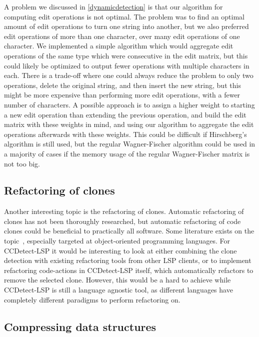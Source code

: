 A problem we discussed in \cref{dynamicdetection} is that our algorithm for computing edit
operations is not optimal. The problem was to find an optimal amount of edit operations to
turn one string into another, but we also preferred edit operations of more than one
character, over many edit operations of one character. We implemented a simple algorithm
which would aggregate edit operations of the same type which were consecutive in the edit
matrix, but this could likely be optimized to output fewer operations with multiple
characters in each. There is a trade-off where one could always reduce the problem to only
two operations, delete the original string, and then insert the new string, but this might
be more expensive than performing more edit operations, with a fewer number of characters.
A possible approach is to assign a higher weight to starting a new edit operation than
extending the previous operation, and build the edit matrix with these weights in mind,
and using our algorithm to aggregate the edit operations afterwards with these weights.
This could be difficult if Hirschberg's algorithm is still used, but the regular
Wagner-Fischer algorithm could be used in a majority of cases if the memory usage of the
regular Wagner-Fischer matrix is not too big.

\subsection*{Refactoring of clones}

Another interesting topic is the refactoring of clones. Automatic refactoring of clones
has not been thoroughly researched, but automatic refactoring of code clones could be
beneficial to practically all software. Some literature exists on the
topic~\cite{TowardsAutomatedRefactoring, RefactoringOrientedClones}, especially targeted
at object-oriented programming languages. For CCDetect-LSP it would be interesting to look
at either combining the clone detection with existing refactoring tools from other LSP
clients, or to implement refactoring code-actions in CCDetect-LSP itself, which
automatically refactors to remove the selected clone. However, this would be a hard to
achieve while CCDetect-LSP is still a language agnostic tool, as different languages have
completely different paradigms to perform refactoring on.

\subsection*{Compressing data structures}

